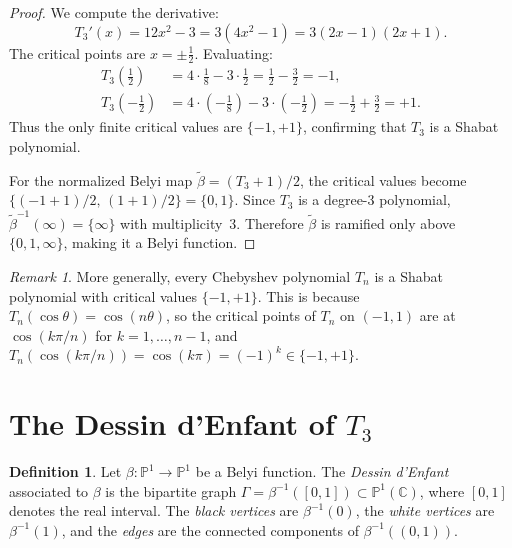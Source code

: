 \documentclass[12pt]{amsart}
\theoremstyle{definition}
\newtheorem{definition}[theorem]{Definition}
\theoremstyle{remark}
\newtheorem{remark}[theorem]{Remark}
\newcommand{\CC}{\mathbb{C}}
\newcommand{\PP}{\mathbb{P}}
\begin{document}
\begin{proof}
We compute the derivative:
\[
  T_3'(x) = 12x^2 - 3 = 3(4x^2-1) = 3(2x-1)(2x+1).
\]
The critical points are $x = \pm\tfrac{1}{2}$.  Evaluating:
\begin{align*}
  T_3\!\left(\tfrac{1}{2}\right)
    &= 4\cdot\tfrac{1}{8} - 3\cdot\tfrac{1}{2}
     = \tfrac{1}{2} - \tfrac{3}{2} = -1, \\[4pt]
  T_3\!\left(-\tfrac{1}{2}\right)
    &= 4\cdot\left(-\tfrac{1}{8}\right) - 3\cdot\left(-\tfrac{1}{2}\right)
     = -\tfrac{1}{2} + \tfrac{3}{2} = +1.
\end{align*}
Thus the only finite critical values are $\{-1,+1\}$, confirming that
$T_3$ is a Shabat polynomial.

For the normalized Belyi map $\tilde{\beta} = (T_3+1)/2$, the critical
values become $\{(-1+1)/2,\, (1+1)/2\} = \{0,1\}$.  Since $T_3$ is a
degree-3 polynomial, $\tilde{\beta}^{-1}(\infty) = \{\infty\}$ with
multiplicity~3.  Therefore $\tilde{\beta}$ is ramified only above
$\{0,1,\infty\}$, making it a Belyi function.
\end{proof}

\begin{remark}\label{rem:cheb-shabat}
More generally, every Chebyshev polynomial $T_n$ is a Shabat polynomial
with critical values $\{-1,+1\}$.  This is because $T_n(\cos\theta)=
\cos(n\theta)$, so the critical points of $T_n$ on $(-1,1)$ are at
$\cos(k\pi/n)$ for $k=1,\ldots,n-1$, and $T_n(\cos(k\pi/n)) =
\cos(k\pi) = (-1)^k \in \{-1,+1\}$.
\end{remark}


\section{The Dessin d'Enfant of $T_3$}\label{sec:dessin}

\begin{definition}\label{def:dessin}
Let $\beta\colon\PP^1\to\PP^1$ be a Belyi function.  The
\emph{Dessin d'Enfant} associated to $\beta$ is the bipartite graph
$\Gamma = \beta^{-1}([0,1]) \subset \PP^1(\CC)$, where $[0,1]$ denotes
the real interval.  The \emph{black vertices} are $\beta^{-1}(0)$,
the \emph{white vertices} are $\beta^{-1}(1)$, and the \emph{edges}
are the connected components of $\beta^{-1}((0,1))$.
\end{definition}
\end{document}
